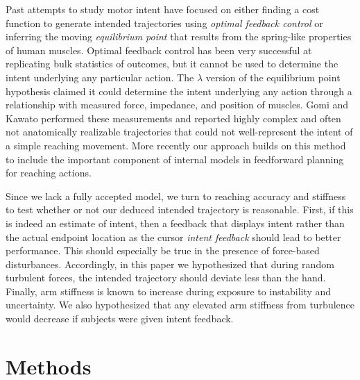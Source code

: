 \documentclass[letterpaper, 10 pt, conference]{ieeeconf}  %
\begin{document}
Past attempts to study motor intent have focused on either finding a cost function to generate intended trajectories using \textit{optimal feedback control} or inferring the moving \textit{equilibrium point} that results from the spring-like properties of human muscles. Optimal feedback control has been very successful at replicating bulk statistics of outcomes, but it cannot be used to determine the intent underlying any particular action\cite{todorov2002optimal}. The $\lambda$ version of the equilibrium point hypothesis claimed it could determine the intent underlying any action through a relationship with measured force, impedance, and position of muscles\cite{feldman1995origin}. Gomi and Kawato\cite{gomi1997human} performed these measurements and reported highly complex and often not anatomically realizable trajectories that could not well-represent the intent of a simple reaching movement. More recently our approach \cite{horowitz2015determining} builds on this method to include the important component of internal models in feedforward planning for reaching actions. 

Since we lack a fully accepted model, we turn to reaching accuracy and stiffness to test whether or not our deduced intended trajectory is reasonable. First, if this is indeed an estimate of intent, then a feedback that displays intent rather than the actual endpoint location as the cursor \textit{intent feedback} should lead to better performance. This should especially be true in the presence of force-based disturbances. Accordingly, in this paper we hypothesized that during random turbulent forces, the intended trajectory should deviate less than the hand. Finally, arm stiffness is known to increase during exposure to instability\cite{franklin2003adaptation} and uncertainty\cite{takahashi2001impedance}. We also hypothesized that any elevated arm stiffness from turbulence would decrease if subjects were given intent feedback.

\section{Methods}
\end{document}
